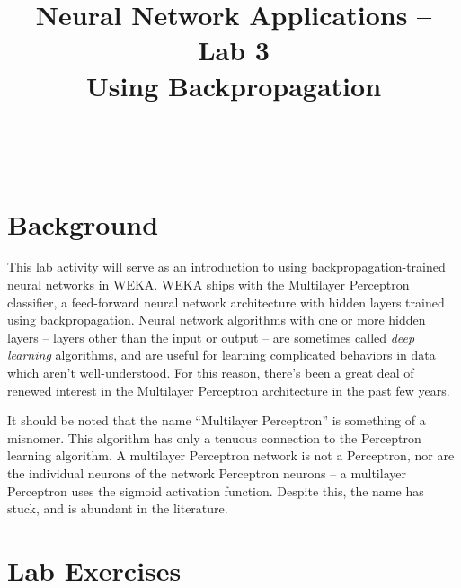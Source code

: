 \documentclass[11pt]{cselabheader}
\title{Neural Network Applications -- Lab 3 \\ Using Backpropagation}
\begin{document}
\maketitle

\horrule{0.5pt}\\\horrule{2pt}

\section{Background}

This lab activity will serve as an introduction to using backpropagation-trained neural networks in WEKA. WEKA ships with the Multilayer Perceptron classifier, a feed-forward neural network architecture with hidden layers trained using backpropagation. Neural network algorithms with one or more hidden layers -- layers other than the input or output -- are sometimes called \emph{deep learning} algorithms, and are useful for learning complicated behaviors in data which aren't well-understood. For this reason, there's been a great deal of renewed interest in the Multilayer Perceptron architecture in the past few years.

It should be noted that the name ``Multilayer Perceptron'' is something of a misnomer. This algorithm has only a tenuous connection to the Perceptron learning algorithm. A multilayer Perceptron network is not a Perceptron, nor are the individual neurons of the network Perceptron neurons -- a multilayer Perceptron uses the sigmoid activation function. Despite this, the name has stuck, and is abundant in the literature.

\pagebreak

\section{Lab Exercises}
\end{document}
